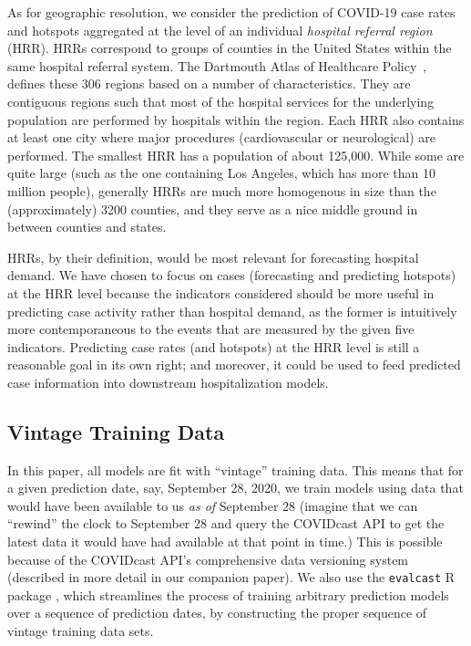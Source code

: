 \documentclass[9pt,twocolumn,twoside,lineno]{pnas-new}
\begin{document}
As for geographic resolution, we consider the prediction of COVID-19 case rates
and hotspots aggregated at the level of an individual \textit{hospital referral
  region} (HRR). HRRs correspond to groups of counties in the United States
within the same hospital referral system. The Dartmouth Atlas of Healthcare 
Policy~\cite{DartmouthHRR}, defines these 306 regions based on a number of
characteristics. They are contiguous regions such that most of the hospital
services for the underlying population are performed by hospitals within the
region. Each HRR also contains at least one city where major procedures
(cardiovascular or neurological) are performed. The smallest HRR has a
population of about 125,000. While some are quite large (such as the one
containing Los Angeles, which has more than 10 million people), generally HRRs  
are much more homogenous in size than the (approximately) 3200 counties,  
and they serve as a nice middle ground in between counties and states.  

HRRs, by their definition, would be most relevant for forecasting hospital
demand.  We have chosen to focus on cases (forecasting and predicting
hotspots) at the HRR level because the indicators considered should be more 
useful in predicting case activity rather than hospital demand, as the former is  
intuitively more contemporaneous to the events that are measured by
the given five indicators. Predicting case rates (and hotspots) at the HRR level
is still a reasonable goal in its own right; and moreover, it could be used to
feed predicted case information into downstream hospitalization models.

\subsection{Vintage Training Data}

In this paper, all models are fit with ``vintage'' training data. This means
that for a given prediction date, say, September 28, 2020, we train models 
using data that would have been available to us \textit{as of}
September 28 (imagine that we can ``rewind'' the clock to September 28 and query
the COVIDcast API to get the latest data it would have had available at that
point in time.)  This is possible because of the COVIDcast API's comprehensive
data versioning system (described in more detail in our companion paper).  We
also use the \texttt{evalcast} R package \cite{EvalcastR}, which streamlines the 
process of training arbitrary prediction models over a sequence of prediction
dates, by constructing the proper sequence of vintage training data sets.   
\end{document}
